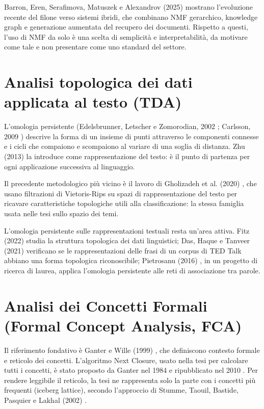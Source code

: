\documentclass[12pt,a4paper,oneside]{report}
\begin{document}
Barron, Eren, Serafimova, Matuszek e Alexandrov (2025) \cite{barron2025bridging} mostrano l'evoluzione recente del filone verso sistemi ibridi, che combinano NMF gerarchico, knowledge graph e generazione aumentata del recupero dei documenti. Rispetto a questi, l'uso di NMF da solo è una scelta di semplicità e interpretabilità, da motivare come tale e non presentare come uno standard del settore.

\section{Analisi topologica dei dati applicata al testo (TDA)}
L'omologia persistente (Edelsbrunner, Letscher e Zomorodian, 2002 \cite{edelsbrunner2002persistence}; Carlsson, 2009 \cite{carlsson2009topology}) descrive la forma di un insieme di punti attraverso le componenti connesse e i cicli che compaiono e scompaiono al variare di una soglia di distanza. Zhu (2013) \cite{zhu2013persistent} la introduce come rappresentazione del testo: è il punto di partenza per ogni applicazione successiva al linguaggio. 

Il precedente metodologico più vicino è il lavoro di Gholizadeh et al. (2020) \cite{gholizadeh2020additive}, che usano filtrazioni di Vietoris-Rips su spazi di rappresentazione del testo per ricavare caratteristiche topologiche utili alla classificazione: la stessa famiglia usata nelle tesi sullo spazio dei temi.

L'omologia persistente sulle rappresentazioni testuali resta un'area attiva. Fitz (2022) \cite{fitz2022shape} studia la struttura topologica dei dati linguistici; Das, Haque e Tanveer (2021) \cite{das2021tedtalk} verificano se le rappresentazioni delle frasi di un corpus di TED Talk abbiano una forma topologica riconoscibile; Pietrosanu (2016) \cite{pietrosanu2016persistent}, in un progetto di ricerca di laurea, applica l'omologia persistente alle reti di associazione tra parole.

\section{Analisi dei Concetti Formali (Formal Concept Analysis, FCA)}
Il riferimento fondativo è Ganter e Wille (1999) \cite{ganter1999fca}, che definiscono contesto formale e reticolo dei concetti. L'algoritmo Next Closure, usato nella tesi per calcolare tutti i concetti, è stato proposto da Ganter nel 1984 e ripubblicato nel 2010 \cite{ganter2010twobasic}. Per rendere leggibile il reticolo, la tesi ne rappresenta solo la parte con i concetti più frequenti (iceberg lattice), secondo l'approccio di Stumme, Taouil, Bastide, Pasquier e Lakhal (2002) \cite{stumme2002titanic}.
\end{document}
